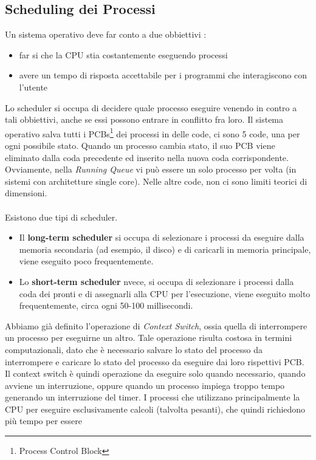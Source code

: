 \documentclass[12pt, letterpaper]{article}
\begin{document}
\subsection{Scheduling dei Processi}
Un sistema operativo deve far conto a due obbiettivi : \begin{itemize}
    \item far si che la CPU stia costantemente eseguendo processi 
    \item avere un tempo di risposta accettabile per i programmi che interagiscono con l'utente
\end{itemize}
Lo scheduler si occupa di decidere quale processo eseguire venendo in contro a tali obbiettivi, anche se 
essi possono entrare in conflitto fra loro. Il sistema operativo salva tutti i PCBs\footnote{
 Process Control Block
} dei processi in delle code, ci sono 5 code, una per ogni possibile stato. Quando un processo cambia stato, 
il suo PCB viene eliminato dalla coda precedente ed inserito nella nuova coda corrispondente. Ovviamente, 
nella \textit{Running Queue} vi può essere un solo processo per volta (in sistemi con architetture single core).
Nelle altre code, non ci sono limiti teorici di dimensioni.
\\\hphantom{}\\ 
Esistono due tipi di scheduler.\begin{itemize}
    \item Il \textbf{long-term scheduler} si occupa di selezionare i processi da eseguire dalla memoria secondaria 
    (ad esempio, il disco) e di caricarli in memoria principale, viene eseguito poco frequentemente.
    \item Lo \textbf{short-term scheduler} nvece, si occupa di selezionare i
     processi dalla coda dei pronti e di assegnarli alla CPU per l'esecuzione, viene eseguito molto frequentemente,
     circa ogni 50-100 millisecondi.
\end{itemize}
Abbiamo già definito l'operazione di \textit{Context Switch}, ossia quella di interrompere un processo per 
eseguirne un altro. Tale operazione risulta costosa in termini computazionali, dato che è necessario salvare 
lo stato del processo da interrompere e caricare lo stato del processo da eseguire dai loro rispettivi 
PCB. Il context switch è quindi operazione da eseguire solo quando necessario, quando avviene un interruzione, oppure 
quando un processo impiega troppo tempo generando un interruzione del timer. I processi che utilizzano principalmente 
la CPU per eseguire esclusivamente calcoli (talvolta pesanti), che quindi richiedono più tempo per essere 
\end{document}
